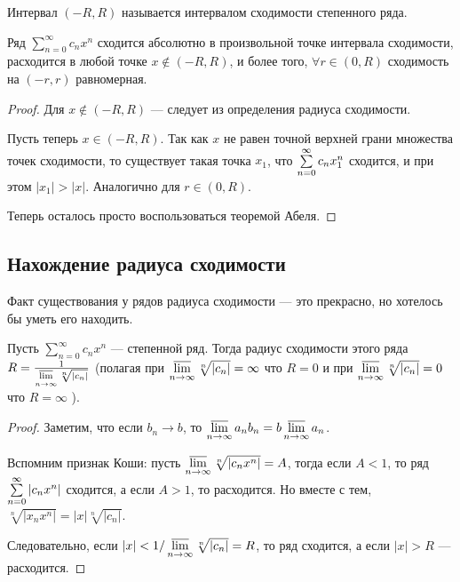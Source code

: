 \documentclass[a4paper, 12pt]{article}
\begin{document}
\begin{Def}
Интервал $(-R, R)$ называется интервалом сходимости степенного ряда.
\end{Def}

\begin{Consequence}
	Ряд  $\sum\limits_{n = 0}^{\infty}c_n x^n$ сходится абсолютно в произвольной точке интервала сходимости, расходится в любой точке $x \not\in (-R, R)$, и более того, $\forall r \in (0, R)$ сходимость на $(-r, r)$ равномерная.
\end{Consequence}
\begin{proof}
Для $x \not \in (-R, R)$ --- следует из определения радиуса сходимости.

Пусть теперь $x \in (-R, R)$. Так как $x$ не равен точной верхней грани множества точек сходимости, то существует такая точка $x_1$, что $\sum\limits_{n=0}^{\infty} c_nx_1^n$ сходится, и при этом $|x_1| > |x|$. Аналогично для $r \in (0, R)$.

Теперь осталось просто воспользоваться теоремой Абеля.
\end{proof}

\subsection{Нахождение радиуса сходимости}

Факт существования у рядов радиуса сходимости --- это прекрасно, но хотелось бы уметь его находить.


\begin{Theorem} 
	Пусть $\sum\limits_{n = 0}^{\infty}c_n x^n$  --- степенной ряд. Тогда радиус сходимости этого ряда $R= \frac{1}{\varlimsup\limits_{n \to \infty} \sqrt[n]{|c_n|}}$ (полагая при $\varlimsup\limits_{n \to \infty} \sqrt[n]{|c_n|} = \infty$ что $R = 0$ и при $\varlimsup\limits_{n \to \infty} \sqrt[n]{|c_n|} = 0$ что $R = \infty$ ).
\end{Theorem}
\begin{proof}
	Заметим, что если $b_n \to b$, то $\varlimsup\limits_{n \to \infty} a_nb_n = b\varlimsup\limits_{n \to \infty} a_n$.
	
	Вспомним признак Коши: пусть $\varlimsup\limits_{n \to \infty} \sqrt[n]{|c_nx^n|} = A$, тогда если $A < 1$, то ряд $\sum\limits_{n=0}^{\infty} |c_nx^n|$ сходится, а если $A > 1$, то расходится. Но вместе с тем, $\sqrt[n]{|x_nx^n|} = |x|\sqrt[n]{|c_n|}$.
	
	Следовательно, если $|x| < 1 / \varlimsup\limits_{n \to \infty} \sqrt[n]{|c_n|} = R$, то ряд сходится, а если $|x| > R$ --- расходится.
\end{proof}
\end{document}
